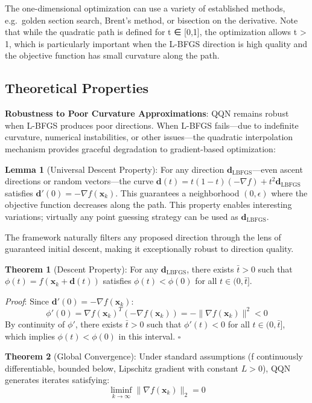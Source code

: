 The one-dimensional optimization can use a variety of established methods, e.g.~golden section search, Brent's method, or bisection on the derivative.
Note that while the quadratic path is defined for t ∈ {[}0,1{]}, the optimization allows t \textgreater{} 1, which is particularly important when the L-BFGS direction is high quality and the objective function has small curvature along the path.

\hypertarget{theoretical-properties}{%
\subsection{Theoretical Properties}\label{theoretical-properties}}

\textbf{Robustness to Poor Curvature Approximations}: QQN remains robust when L-BFGS produces poor directions.
When L-BFGS fails---due to indefinite curvature, numerical instabilities, or other issues---the quadratic interpolation mechanism provides graceful degradation to gradient-based optimization:

\textbf{Lemma 1} (Universal Descent Property): For any direction \(\mathbf{d}_{\text{LBFGS}}\)---even ascent directions or random vectors---the curve \(\mathbf{d}(t) = t(1-t)(-\nabla f) + t^2 \mathbf{d}_{\text{LBFGS}}\) satisfies \(\mathbf{d}'(0) = -\nabla f(\mathbf{x}_k)\).
This guarantees a neighborhood \((0, \epsilon)\) where the objective function decreases along the path.
This property enables interesting variations; virtually any point guessing strategy can be used as \(\mathbf{d}_{\text{LBFGS}}\).

The framework naturally filters any proposed direction through the lens of guaranteed initial descent, making it exceptionally robust to direction quality.

\textbf{Theorem 1} (Descent Property): For any \(\mathbf{d}_{\text{LBFGS}}\), there exists \(\bar{t} > 0\) such that \(\phi(t) = f(\mathbf{x}_k + \mathbf{d}(t))\) satisfies \(\phi(t) < \phi(0)\) for all \(t \in (0, \bar{t}]\).

\emph{Proof}: Since \(\mathbf{d}'(0) = -\nabla f(\mathbf{x}_k)\):
\[\phi'(0) = \nabla f(\mathbf{x}_k)^T (-\nabla f(\mathbf{x}_k)) = -\|\nabla f(\mathbf{x}_k)\|^2 < 0\]
By continuity of \(\phi'\), there exists \(\bar{t} > 0\) such that \(\phi'(t) < 0\) for all \(t \in (0, \bar{t}]\), which implies \(\phi(t) < \phi(0)\) in this interval. \(\square\)

\textbf{Theorem 2} (Global Convergence): Under standard assumptions (f continuously differentiable, bounded below, Lipschitz gradient with constant \(L > 0\)), QQN generates iterates satisfying:
\[\liminf_{k \to \infty} \|\nabla f(\mathbf{x}_k)\|_2 = 0\]

